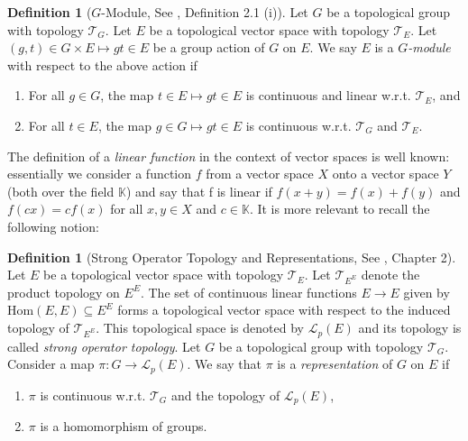 \documentclass{amsart}
\theoremstyle{definition}
\newtheorem{definition}[theorem]{Definition}
\numberwithin{equation}{section}
\newcommand*{\ix}[1]{\textit{#1}}
\newcommand*{\Tw}{\mathcal{T}}
\begin{document}
\begin{definition}[$G$-Module, See \cite{hofmann}, Definition 2.1 (i)]\label{gmod}Let $G$ be a topological group with topology $\mathcal{T}_G$. Let $E$ be a topological vector space with topology $\mathcal{T}_E$. Let $(g,t)\in G\times E \mapsto gt\in E$ be a group action of $G$ on $E$.
We say $E$ is a \ix{$G$-module} with respect to the above action if
\begin{enumerate}
\item[{\rm (i).}] For all $g\in G$, the map $t\in E\mapsto gt\in E$ is continuous and linear w.r.t. $\mathcal{T}_E$, and
\item[{\rm (ii).}] For all $t\in E$, the map $g\in G\mapsto gt\in E$ is continuous w.r.t. $\mathcal{T}_G$ and $\mathcal{T}_E$.
\end{enumerate}
\end{definition}




The definition of a \textit{linear function} in the context of vector spaces is well known: essentially we consider a function $f$ from a vector space $X$ onto a vector space $Y$ (both over the field $\mathbb{K}$) and say that f is linear if $f({x}+{y})=f({x})+f({y})$
and $f(c{x})=cf({x})$ for all ${x}, {y} \in X$ and $c \in \mathbb{K}$.
It is more relevant to recall the following notion:

\begin{definition}[Strong Operator Topology and Representations, See \cite{hofmann}, Chapter 2]\label{defrepresentation} Let $E$ be a topological vector space with topology $\Tw_E$. Let $\Tw_{E^E}$ denote the product topology on $E^E$. The set of continuous linear functions $E\rightarrow E$ given by $\mathrm{Hom}(E,E)\subseteq E^E$ forms a topological vector space with respect to the induced topology of $\Tw_{E^E}$. This topological space is denoted by \ix{$\mathcal{L}_p(E)$} and its topology is called \textit{strong operator topology}.
Let $G$ be a topological group with topology $\Tw_G$. Consider a map $\pi: G\rightarrow \mathcal{L}_p(E)$. We say that $\pi$ is a \ix{representation} of $G$ on $E$ if
\begin{enumerate}
\item[{\rm (i)}.] $\pi$ is continuous w.r.t. $\Tw_G$ and the topology of $\mathcal{L}_p(E)$,
\item[{\rm (ii)}.] $\pi$ is a homomorphism of groups.
\end{enumerate}
\end{definition}
\end{document}
